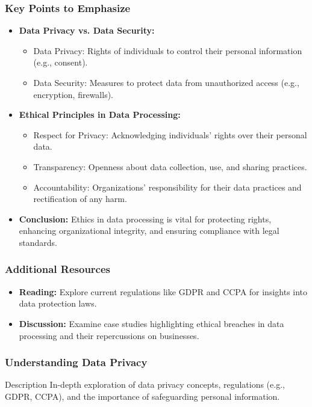 \documentclass[aspectratio=169]{beamer}
\begin{document}
\begin{frame}[fragile]
    \frametitle{Key Points to Emphasize}
    \begin{itemize}
        \item \textbf{Data Privacy vs. Data Security:}
        \begin{itemize}
            \item Data Privacy: Rights of individuals to control their personal information (e.g., consent).
            \item Data Security: Measures to protect data from unauthorized access (e.g., encryption, firewalls).
        \end{itemize}
        
        \item \textbf{Ethical Principles in Data Processing:}
        \begin{itemize}
            \item Respect for Privacy: Acknowledging individuals’ rights over their personal data.
            \item Transparency: Openness about data collection, use, and sharing practices.
            \item Accountability: Organizations’ responsibility for their data practices and rectification of any harm.
        \end{itemize}
        
        \item \textbf{Conclusion:}  
        Ethics in data processing is vital for protecting rights, enhancing organizational integrity, and ensuring compliance with legal standards.
    \end{itemize}
\end{frame}

\begin{frame}[fragile]
    \frametitle{Additional Resources}
    \begin{itemize}
        \item \textbf{Reading:} Explore current regulations like GDPR and CCPA for insights into data protection laws.
        \item \textbf{Discussion:} Examine case studies highlighting ethical breaches in data processing and their repercussions on businesses.
    \end{itemize}
\end{frame}

\begin{frame}[fragile]
    \frametitle{Understanding Data Privacy}
    \begin{block}{Description}
        In-depth exploration of data privacy concepts, regulations (e.g., GDPR, CCPA), and the importance of safeguarding personal information.
    \end{block}
\end{frame}
\end{document}
